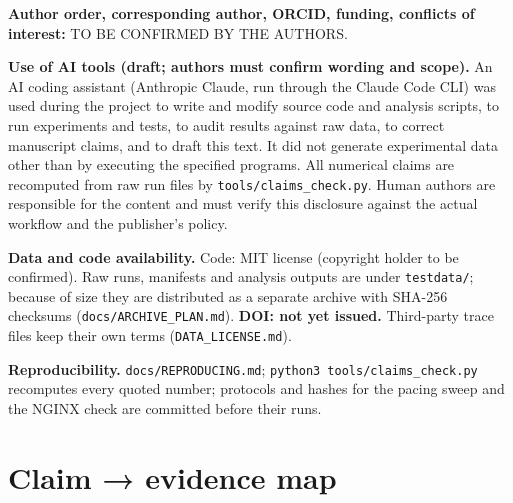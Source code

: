 \documentclass[10pt,a4paper]{article}
\begin{document}
\textbf{Author order, corresponding author, ORCID, funding, conflicts of interest:} TO BE CONFIRMED BY THE AUTHORS.


\textbf{Use of AI tools (draft; authors must confirm wording and scope).} An AI coding assistant (Anthropic Claude, run through the Claude Code CLI) was used during the project to write and modify source code and analysis scripts, to run experiments and tests, to audit results against raw data, to correct manuscript claims, and to draft this text. It did not generate experimental data other than by executing the specified programs. All numerical claims are recomputed from raw run files by \texttt{tools/\allowbreak{}claims\_check.py}. Human authors are responsible for the content and must verify this disclosure against the actual workflow and the publisher's policy.


\textbf{Data and code availability.} Code: MIT license (copyright holder to be confirmed). Raw runs, manifests and analysis outputs are under \texttt{testdata/\allowbreak{}}; because of size they are distributed as a separate archive with SHA-256 checksums (\texttt{docs/\allowbreak{}ARCHIVE\_PLAN.md}). \textbf{DOI: not yet issued.} Third-party trace files keep their own terms (\texttt{DATA\_LICENSE.md}).


\textbf{Reproducibility.} \texttt{docs/\allowbreak{}REPRODUCING.md}; \texttt{python3 tools/\allowbreak{}claims\_check.py} recomputes every quoted number; protocols and hashes for the pacing sweep and the NGINX check are committed before their runs.



\section*{Claim → evidence map}
\end{document}
